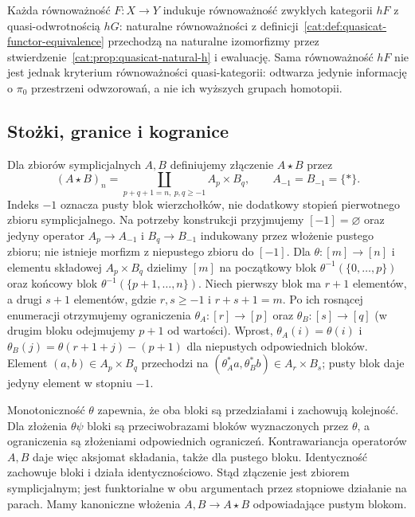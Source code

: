 Każda równoważność $F:X\to Y$ indukuje równoważność zwykłych kategorii $hF$ z quasi-odwrotnością $hG$: naturalne równoważności z definicji~\ref{cat:def:quasicat-functor-equivalence} przechodzą na naturalne izomorfizmy przez stwierdzenie~\ref{cat:prop:quasicat-natural-h} i ewaluację. Sama równoważność $hF$ nie jest jednak kryterium równoważności quasi-kategorii: odtwarza jedynie informację o $\pi_0$ przestrzeni odwzorowań, a nie ich wyższych grupach homotopii.

\subsection{Stożki, granice i kogranice}

\begin{definicja}\label{cat:def:simplicial-join}
Dla zbiorów symplicjalnych $A,B$ definiujemy złączenie $A\star B$ przez
\[
 (A\star B)_n=\coprod_{p+q+1=n,\ p,q\geq-1} A_p\times B_q,
 \qquad A_{-1}=B_{-1}=\{*\}.
\]
Indeks $-1$ oznacza pusty blok wierzchołków, nie dodatkowy stopień pierwotnego zbioru symplicjalnego. Na potrzeby konstrukcji przyjmujemy $[-1]=\varnothing$ oraz jedyny operator $A_p\to A_{-1}$ i $B_q\to B_{-1}$ indukowany przez włożenie pustego zbioru; nie istnieje morfizm z niepustego zbioru do $[-1]$.
Dla $\theta:[m]\to[n]$ i elementu składowej $A_p\times B_q$ dzielimy $[m]$ na początkowy blok $\theta^{-1}(\{0,\ldots,p\})$ oraz końcowy blok $\theta^{-1}(\{p+1,\ldots,n\})$. Niech pierwszy blok ma $r+1$ elementów, a drugi $s+1$ elementów, gdzie $r,s\geq-1$ i $r+s+1=m$. Po ich rosnącej enumeracji otrzymujemy ograniczenia $\theta_A:[r]\to[p]$ oraz $\theta_B:[s]\to[q]$ (w drugim bloku odejmujemy $p+1$ od wartości). Wprost, $\theta_A(i)=\theta(i)$ i $\theta_B(j)=\theta(r+1+j)-(p+1)$ dla niepustych odpowiednich bloków. Element $(a,b)\in A_p\times B_q$ przechodzi na $(\theta_A^*a,\theta_B^*b)\in A_r\times B_s$; pusty blok daje jedyny element w stopniu $-1$.
\end{definicja}
Monotoniczność $\theta$ zapewnia, że oba bloki są przedziałami i zachowują kolejność. Dla złożenia $\theta\psi$ bloki są przeciwobrazami bloków wyznaczonych przez $\theta$, a ograniczenia są złożeniami odpowiednich ograniczeń. Kontrawariancja operatorów $A,B$ daje więc aksjomat składania, także dla pustego bloku. Identyczność zachowuje bloki i działa identycznościowo. Stąd złączenie jest zbiorem symplicjalnym; jest funktorialne w obu argumentach przez stopniowe działanie na parach. Mamy kanoniczne włożenia $A,B\to A\star B$ odpowiadające pustym blokom.

